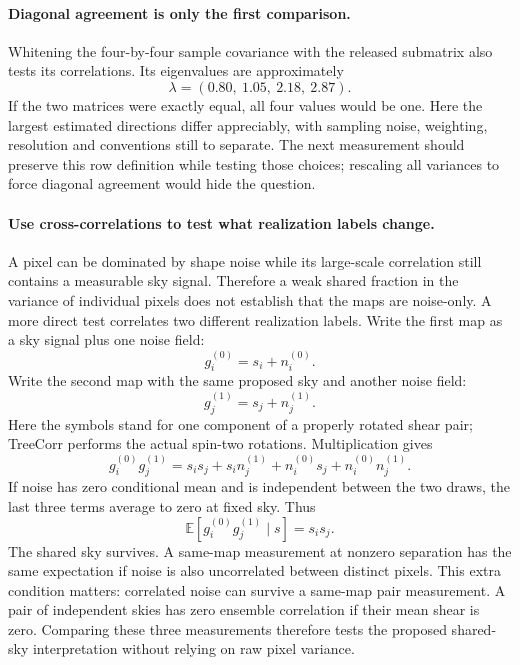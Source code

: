 \documentclass[11pt]{article}
\newcommand{\E}{\mathbb{E}}
\begin{document}
\paragraph{Diagonal agreement is only the first comparison.}
Whitening the four-by-four sample covariance with the released submatrix
also tests its correlations. Its eigenvalues are approximately
\begin{equation}
 \lambda=(0.80,\ 1.05,\ 2.18,\ 2.87).
\end{equation}
If the two matrices were exactly equal, all four values would be one.
Here the largest estimated directions differ appreciably, with sampling
noise, weighting, resolution and conventions still to separate. The next
measurement should preserve this row definition while testing those choices;
rescaling all variances to force diagonal agreement would hide the question.

\paragraph{Use cross-correlations to test what realization labels change.}
A pixel can be dominated by shape noise while its large-scale correlation
still contains a measurable sky signal. Therefore a weak shared fraction
in the variance of individual pixels does not establish that the maps are
noise-only. A more direct test correlates two different realization labels.
Write the first map as a sky signal plus one noise field:
\begin{equation}
 g^{(0)}_i=s_i+n^{(0)}_i.
\end{equation}
Write the second map with the same proposed sky and another noise field:
\begin{equation}
 g^{(1)}_j=s_j+n^{(1)}_j.
\end{equation}
Here the symbols stand for one component of a properly rotated shear pair;
TreeCorr performs the actual spin-two rotations. Multiplication gives
\begin{equation}
 g^{(0)}_i g^{(1)}_j
 =s_i s_j+s_i n^{(1)}_j+n^{(0)}_i s_j+n^{(0)}_i n^{(1)}_j.
\end{equation}
If noise has zero conditional mean and is independent between the two draws,
the last three terms average to zero at fixed sky. Thus
\begin{equation}
 \E[g^{(0)}_i g^{(1)}_j\mid s]=s_i s_j.
\end{equation}
The shared sky survives. A same-map measurement at nonzero separation has
the same expectation if noise is also uncorrelated between distinct pixels.
This extra condition matters: correlated noise can survive a same-map pair
measurement. A pair of independent skies has zero ensemble correlation if
their mean shear is zero. Comparing these three measurements therefore tests
the proposed shared-sky interpretation without relying on raw pixel variance.
\end{document}
